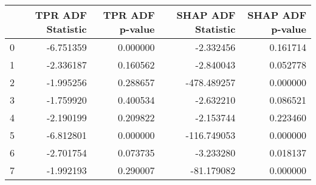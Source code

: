\begin{tabular}{lrrrr}
\toprule
 & TPR ADF Statistic & TPR ADF p-value & SHAP ADF Statistic & SHAP ADF p-value \\
\midrule
0 & -6.751359 & 0.000000 & -2.332456 & 0.161714 \\
1 & -2.336187 & 0.160562 & -2.840043 & 0.052778 \\
2 & -1.995256 & 0.288657 & -478.489257 & 0.000000 \\
3 & -1.759920 & 0.400534 & -2.632210 & 0.086521 \\
4 & -2.190199 & 0.209822 & -2.153744 & 0.223460 \\
5 & -6.812801 & 0.000000 & -116.749053 & 0.000000 \\
6 & -2.701754 & 0.073735 & -3.233280 & 0.018137 \\
7 & -1.992193 & 0.290007 & -81.179082 & 0.000000 \\
\bottomrule
\end{tabular}
